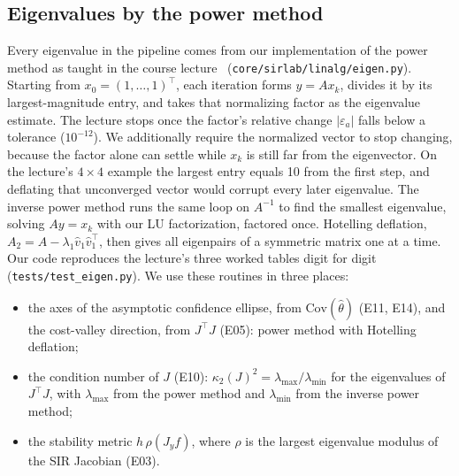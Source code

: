 \subsection{Eigenvalues by the power method}
\label{sec:eigen}
Every eigenvalue in the pipeline comes from our implementation of the power method as taught in
the course lecture~\cite{tahmid_eigen} (\texttt{core/sirlab/linalg/eigen.py}). Starting from
$x_0 = (1, \dots, 1)^\top$, each iteration forms $y = A x_k$, divides it by its largest-magnitude
entry, and takes that normalizing factor as the eigenvalue estimate. The lecture stops once the
factor's relative change $|\varepsilon_a|$ falls below a tolerance ($10^{-12}$). We additionally
require the normalized vector to stop changing, because the factor alone can settle while $x_k$ is
still far from the eigenvector. On the lecture's $4\times4$ example the largest entry equals 10
from the first step, and deflating that unconverged vector would corrupt every later eigenvalue.
The inverse power method runs the same loop on $A^{-1}$ to find the smallest eigenvalue, solving
$A y = x_k$ with our LU factorization, factored once. Hotelling deflation,
$A_2 = A - \lambda_1 \hat v_1 \hat v_1^\top$, then gives all eigenpairs of a symmetric matrix one at a
time. Our code reproduces the lecture's three worked tables digit for digit
(\texttt{tests/test\_eigen.py}). We use these routines in three places:
\begin{itemize}
  \item the axes of the asymptotic confidence ellipse, from $\mathrm{Cov}(\hat\theta)$ (E11, E14),
    and the cost-valley direction, from $J^\top J$ (E05): power method with Hotelling deflation;
  \item the condition number of $J$ (E10): $\kappa_2(J)^2 = \lambda_{\max}/\lambda_{\min}$ for the
    eigenvalues of $J^\top J$, with $\lambda_{\max}$ from the power method and $\lambda_{\min}$ from
    the inverse power method;
  \item the stability metric $h\,\rho(J_y f)$, where $\rho$ is the largest eigenvalue modulus of
    the SIR Jacobian (E03).
\end{itemize}

